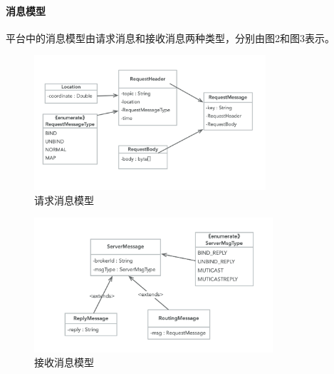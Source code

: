 \documentclass[a4paper, 12pt]{article}
\theoremstyle{definition}
\begin{document}
\paragraph{消息模型}
平台中的消息模型由请求消息和接收消息两种类型，分别由图2和图3表示。
\begin{figure}[ht]
 \centering
 \includegraphics[height=5cm]{images/request_msg.png}
 \caption{请求消息模型}
 \label{fig:singleblock}
\end{figure}
\begin{figure}[ht]
 \centering
 \includegraphics[height=5cm]{images/server_msg.png}
 \caption{接收消息模型}
 \label{fig:singleblock}
\end{figure}
\end{document}
